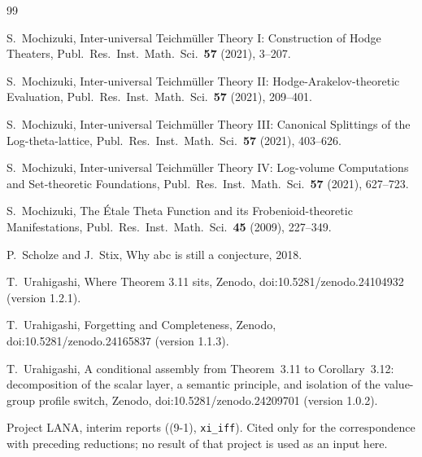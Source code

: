 \documentclass[11pt]{article}
\theoremstyle{definition}
\begin{document}
\begin{thebibliography}{99}

S.~Mochizuki,
Inter-universal Teichm\"uller Theory I: Construction of Hodge
Theaters, Publ.\ Res.\ Inst.\ Math.\ Sci.\ \textbf{57} (2021),
3--207.

S.~Mochizuki,
Inter-universal Teichm\"uller Theory II:
Hodge-Arakelov-theoretic Evaluation,
Publ.\ Res.\ Inst.\ Math.\ Sci.\ \textbf{57} (2021), 209--401.

S.~Mochizuki,
Inter-universal Teichm\"uller Theory III: Canonical Splittings
of the Log-theta-lattice,
Publ.\ Res.\ Inst.\ Math.\ Sci.\ \textbf{57} (2021), 403--626.

S.~Mochizuki,
Inter-universal Teichm\"uller Theory IV: Log-volume
Computations and Set-theoretic Foundations,
Publ.\ Res.\ Inst.\ Math.\ Sci.\ \textbf{57} (2021), 627--723.

S.~Mochizuki,
The \'Etale Theta Function and its Frobenioid-theoretic
Manifestations,
Publ.\ Res.\ Inst.\ Math.\ Sci.\ \textbf{45} (2009), 227--349.

P.~Scholze and J.~Stix, Why abc is still a conjecture, 2018.

T.~Urahigashi, Where Theorem 3.11 sits, Zenodo,
doi:10.5281/zenodo.24104932 (version 1.2.1).

T.~Urahigashi, Forgetting and Completeness, Zenodo,
doi:10.5281/zenodo.24165837 (version 1.1.3).

T.~Urahigashi, A conditional assembly from Theorem~3.11 to
Corollary~3.12: decomposition of the scalar layer, a semantic
principle, and isolation of the value-group profile switch,
Zenodo, doi:10.5281/zenodo.24209701 (version 1.0.2).

Project LANA, interim reports ((9-1), \texttt{xi\_iff}).
Cited only for the correspondence with preceding reductions;
no result of that project is used as an input here.

\end{thebibliography}
\end{document}
